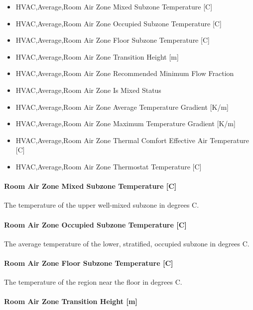 \begin{itemize}
\item
  HVAC,Average,Room Air Zone Mixed Subzone Temperature {[}C{]}
\item
  HVAC,Average,Room Air Zone Occupied Subzone Temperature {[}C{]}
\item
  HVAC,Average,Room Air Zone Floor Subzone Temperature {[}C{]}
\item
  HVAC,Average,Room Air Zone Transition Height {[}m{]}
\item
  HVAC,Average,Room Air Zone Recommended Minimum Flow Fraction
\item
  HVAC,Average,Room Air Zone Is Mixed Status
\item
  HVAC,Average,Room Air Zone Average Temperature Gradient {[}K/m{]}
\item
  HVAC,Average,Room Air Zone Maximum Temperature Gradient {[}K/m{]}
\item
  HVAC,Average,Room Air Zone Thermal Comfort Effective Air Temperature {[}C{]}
\item
  HVAC,Average,Room Air Zone Thermostat Temperature {[}C{]}
\end{itemize}

\paragraph{Room Air Zone Mixed Subzone Temperature {[}C{]}}\label{room-air-zone-mixed-subzone-temperature-c}

The temperature of the upper well-mixed subzone in degrees C.

\paragraph{Room Air Zone Occupied Subzone Temperature {[}C{]}}\label{room-air-zone-occupied-subzone-temperature-c}

The average temperature of the lower, stratified, occupied subzone in degrees C.

\paragraph{Room Air Zone Floor Subzone Temperature {[}C{]}}\label{room-air-zone-floor-subzone-temperature-c}

The temperature of the region near the floor in degrees C.

\paragraph{Room Air Zone Transition Height {[}m{]}}\label{room-air-zone-transition-height-m}

